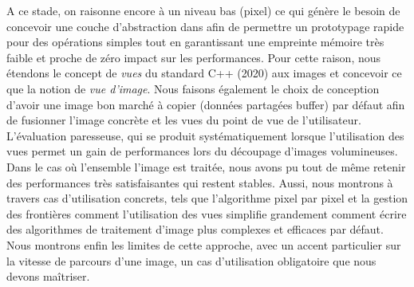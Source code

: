 A ce stade, on raisonne encore à un niveau bas (pixel) ce qui génère le besoin de concevoir une couche d'abstraction
dans afin de permettre un prototypage rapide pour des opérations simples tout en garantissant une empreinte mémoire très
faible et proche de zéro impact sur les performances. Pour cette raison, nous étendons le concept de \emph{vues} du
standard C++ (2020) aux images et concevoir ce que la notion de \emph{vue d'image}. Nous faisons également le choix de
conception d'avoir une image bon marché à copier (données partagées buffer) par défaut afin de fusionner l'image
concrète et les vues du point de vue de l'utilisateur. L'évaluation paresseuse, qui se produit systématiquement lorsque
l'utilisation des vues permet un gain de performances lors du découpage d'images volumineuses. Dans le cas où l'ensemble
l'image est traitée, nous avons pu tout de même retenir des performances très satisfaisantes qui restent stables. Aussi,
nous montrons à travers cas d'utilisation concrets, tels que l'algorithme pixel par pixel et la gestion des frontières
comment l'utilisation des vues simplifie grandement comment écrire des algorithmes de traitement d'image plus complexes
et efficaces par défaut. Nous montrons enfin les limites de cette approche, avec un accent particulier sur la vitesse de
parcours d'une image, un cas d'utilisation obligatoire que nous devons maîtriser.

